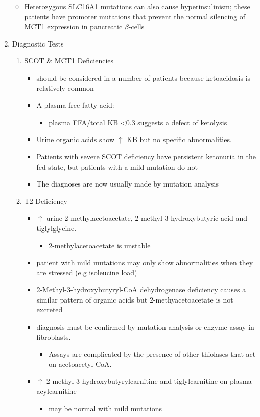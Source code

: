 \documentclass{scrartcl}
\begin{document}
\begin{enumerate}
\begin{itemize}
\item Heterozygous SLC16A1 mutations can also cause hyperinsulinism;
these patients have promoter mutations that prevent the normal
silencing of MCT1 expression in pancreatic \(\beta\)-cells
\end{itemize}

\item Diagnostic Tests
\label{sec:org8db3256}
\begin{enumerate}
\item SCOT \& MCT1 Deficiencies
\label{sec:orgedfca03}
\begin{itemize}
\item should be considered in a number of patients because ketoacidosis is relatively common
\item A plasma free fatty acid:
\begin{itemize}
\item plasma FFA/total KB <0.3 suggests a defect of ketolysis
\end{itemize}
\item Urine organic acids show \(\uparrow\) KB but no specific abnormalities.
\item Patients with severe SCOT deficiency have persistent ketonuria in
the fed state, but patients with a mild mutation do not
\item The diagnoses are now usually made by mutation analysis
\end{itemize}
\item T2 Deficiency
\label{sec:org08db880}
\begin{itemize}
\item \(\uparrow\) urine 2-methylacetoacetate, 2-methyl-3-hydroxybutyric acid
and tiglylglycine.
\begin{itemize}
\item 2-methylacetoacetate is unstable
\end{itemize}
\item patient with mild mutations may only show abnormalities when they
are stressed (e.g isoleucine load)
\item 2-Methyl-3-hydroxybutyryl-CoA dehydrogenase deficiency causes a
similar pattern of organic acids but 2-methyacetoacetate is not excreted
\item diagnosis must be confirmed by mutation analysis or enzyme assay in fibroblasts.
\begin{itemize}
\item Assays are complicated by the presence of other thiolases that act
on acetoacetyl-CoA.
\end{itemize}
\item \(\uparrow\) 2-methyl-3-hydroxybutyrylcarnitine and
tiglylcarnitine on plasma acylcarnitine
\begin{itemize}
\item may be normal with mild mutations
\end{itemize}
\end{itemize}
\end{enumerate}


\end{enumerate}
\end{document}
